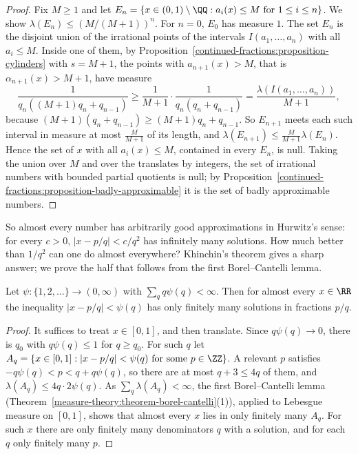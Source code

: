 \begin{proof}
Fix $M \geq 1$ and let $E_n = \{x \in (0, 1) \setminus \QQ : a_i(x) \leq M \text{ for } 1 \leq i \leq n\}$. We show $\lambda(E_n) \leq (M/(M + 1))^n$. For $n = 0$, $E_0$ has measure $1$. The set $E_n$ is
the disjoint union of the irrational points of the intervals $I(a_1, \ldots, a_n)$ with all $a_i \leq M$. Inside one of them, by Proposition~\ref{continued-fractions:proposition-cylinders} with
$s = M + 1$, the points with $a_{n+1}(x) > M$, that is $\alpha_{n+1}(x) > M + 1$, have measure
\[
\frac{1}{q_n((M + 1)q_n + q_{n-1})} \geq \frac{1}{M + 1} \cdot \frac{1}{q_n(q_n + q_{n-1})} = \frac{\lambda(I(a_1, \ldots, a_n))}{M + 1},
\]
because $(M + 1)(q_n + q_{n-1}) \geq (M + 1)q_n + q_{n-1}$. So $E_{n+1}$ meets each such interval in measure at most $\frac{M}{M + 1}$ of its length, and $\lambda(E_{n+1}) \leq \frac{M}{M + 1}\lambda(E_n)$.
Hence the set of $x$ with all $a_i(x) \leq M$, contained in every $E_n$, is null. Taking the union over $M$ and over the translates by integers, the set of irrational numbers with bounded partial quotients
is null; by Proposition~\ref{continued-fractions:proposition-badly-approximable} it is the set of badly approximable numbers.
\end{proof}

So almost every number has arbitrarily good approximations in Hurwitz's sense: for every $c > 0$, $|x - p/q| < c/q^2$ has infinitely many solutions. How much better than $1/q^2$ can one do almost
everywhere? Khinchin's theorem gives a sharp answer; we prove the half that follows from the first Borel--Cantelli lemma.

\begin{theorem}\label{continued-fractions:theorem-khinchin}
Let $\psi \colon \{1, 2, \ldots\} \to (0, \infty)$ with $\sum_qq\psi(q) < \infty$. Then for almost every $x \in \RR$ the inequality $|x - p/q| < \psi(q)$ has only finitely many solutions in fractions
$p/q$.
\end{theorem}

\begin{proof}
It suffices to treat $x \in [0, 1]$, and then translate. Since $q\psi(q) \to 0$, there is $q_0$ with $q\psi(q) \leq 1$ for $q \geq q_0$. For such $q$ let
$A_q = \{x \in [0, 1] : |x - p/q| < \psi(q) \text{ for some } p \in \ZZ\}$. A relevant $p$ satisfies $-q\psi(q) < p < q + q\psi(q)$, so there are at most $q + 3 \leq 4q$ of them, and
$\lambda(A_q) \leq 4q \cdot 2\psi(q)$. As $\sum_q\lambda(A_q) < \infty$, the first Borel--Cantelli lemma (Theorem~\ref{measure-theory:theorem-borel-cantelli}(1)), applied to Lebesgue measure on $[0, 1]$,
shows that almost every $x$ lies in only finitely many $A_q$. For such $x$ there are only finitely many denominators $q$ with a solution, and for each $q$ only finitely many $p$.
\end{proof}

